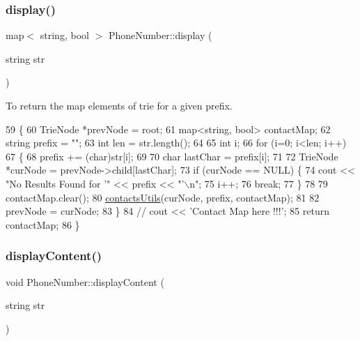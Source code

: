 \subsubsection{\texorpdfstring{display()}{display()}}
{\footnotesize\ttfamily map$<$ string, bool $>$ Phone\+Number\+::display (\begin{DoxyParamCaption}\item[{string}]{str }\end{DoxyParamCaption})}



To return the map elements of trie for a given prefix. 


\begin{DoxyCode}
59                                                  \{
60     TrieNode *prevNode = root;
61     map<string, bool> contactMap;
62     \textcolor{keywordtype}{string} prefix = \textcolor{stringliteral}{""};
63     \textcolor{keywordtype}{int} len = str.length();
64  
65     \textcolor{keywordtype}{int} i;
66     \textcolor{keywordflow}{for} (i=0; i<len; i++)
67     \{
68         prefix += (char)str[i];
69  
70         \textcolor{keywordtype}{char} lastChar = prefix[i];
71  
72         TrieNode *curNode = prevNode->child[lastChar];
73         \textcolor{keywordflow}{if} (curNode == NULL) \{
74             cout << \textcolor{stringliteral}{"No Results Found for '"} << prefix << \textcolor{stringliteral}{"'\(\backslash\)n"};
75             i++;
76             \textcolor{keywordflow}{break};
77         \}
78 
79         contactMap.clear();
80         \hyperlink{class_phone_number_a8ccd9871c68caa6d5b5b8f915d7b2567}{contactsUtils}(curNode, prefix, contactMap);
81  
82         prevNode = curNode;
83     \}
84     \textcolor{comment}{// cout << 'Contact Map here !!!';}
85     \textcolor{keywordflow}{return} contactMap;
86 \}
\end{DoxyCode}
\mbox{\label{class_phone_number_a4e8abfb7ecb3e046a3bbbb4e5bdd3f64}} 
\subsubsection{\texorpdfstring{display\+Content()}{displayContent()}}
{\footnotesize\ttfamily void Phone\+Number\+::display\+Content (\begin{DoxyParamCaption}\item[{string}]{str }\end{DoxyParamCaption})}



